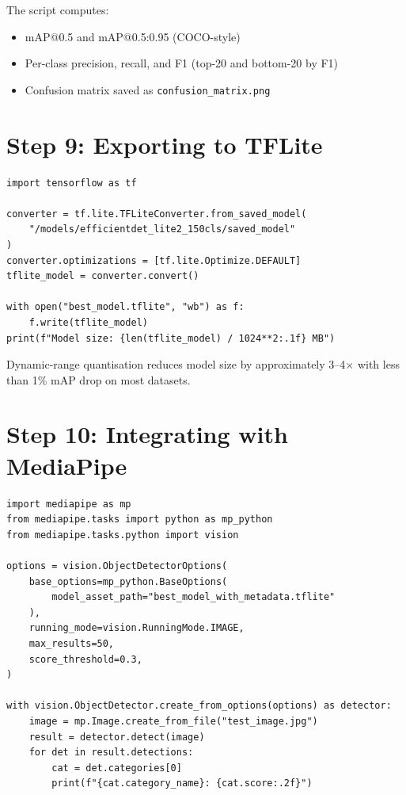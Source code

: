 \documentclass[11pt,a4paper]{article}
\begin{document}
The script computes:
\begin{itemize}[nosep]
    \item mAP@0.5 and mAP@0.5:0.95 (COCO-style)
    \item Per-class precision, recall, and F1 (top-20 and bottom-20 by F1)
    \item Confusion matrix saved as \texttt{confusion\_matrix.png}
\end{itemize}

\section{Step 9: Exporting to TFLite}

\begin{lstlisting}[style=python, caption={Dynamic-range quantisation export}]
import tensorflow as tf

converter = tf.lite.TFLiteConverter.from_saved_model(
    "/models/efficientdet_lite2_150cls/saved_model"
)
converter.optimizations = [tf.lite.Optimize.DEFAULT]
tflite_model = converter.convert()

with open("best_model.tflite", "wb") as f:
    f.write(tflite_model)
print(f"Model size: {len(tflite_model) / 1024**2:.1f} MB")
\end{lstlisting}

Dynamic-range quantisation reduces model size by approximately 3--4$\times$ with
less than 1\% mAP drop on most datasets.

\section{Step 10: Integrating with MediaPipe}

\begin{lstlisting}[style=python, caption={Run inference with MediaPipe Tasks API}]
import mediapipe as mp
from mediapipe.tasks import python as mp_python
from mediapipe.tasks.python import vision

options = vision.ObjectDetectorOptions(
    base_options=mp_python.BaseOptions(
        model_asset_path="best_model_with_metadata.tflite"
    ),
    running_mode=vision.RunningMode.IMAGE,
    max_results=50,
    score_threshold=0.3,
)

with vision.ObjectDetector.create_from_options(options) as detector:
    image = mp.Image.create_from_file("test_image.jpg")
    result = detector.detect(image)
    for det in result.detections:
        cat = det.categories[0]
        print(f"{cat.category_name}: {cat.score:.2f}")
\end{lstlisting}
\end{document}
